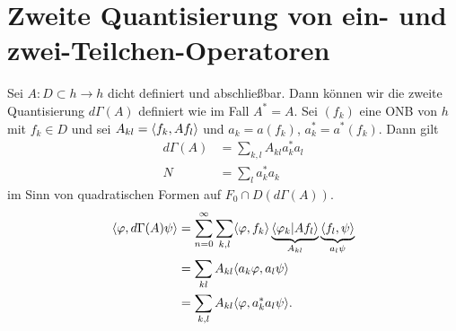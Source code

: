 \documentclass{mycourse}
\begin{document}
\section{Zweite Quantisierung von ein- und zwei-Teilchen-Operatoren}
Sei $A:D\subset h\to h$ dicht definiert und abschließbar. Dann können wir die zweite Quantisierung $d\Gamma(A)$ definiert wie im Fall $A^*=A$. Sei $(f_k)$ eine ONB von $h$ mit $f_k \in D$ und sei $A_{kl} = \langle f_k, A f_l\rangle$ und $a_k = a(f_k)$, $a_k^* = a^*(f_k)$. Dann gilt
\begin{align*}
d\Gamma(A) &= \sum_{k,l} A_{kl} a^*_k a_l\\
N&= \sum_l a_k^* a_k
\end{align*}
im Sinn von quadratischen Formen auf $F_0 \cap D(d\Gamma(A))$.
\begin{align*}
\langle \varphi, d\Gamma(A) \psi\rangle &= \sum_{n=0}^\infty \sum_{k,l} \langle \varphi, f_k\rangle \underbrace{\langle \varphi_k |A f_l\rangle}_{A_{kl}} \underbrace{\langle f_l, \psi\rangle}_{a_l\psi}\\
&= \sum_{kl} A_{kl} \langle a_k \varphi, a_l \psi\rangle\\
&= \sum_{k,l} A_{kl} \langle \varphi, a_k^* a_l \psi \rangle.
\end{align*}

\fixme[Aukommentieren]
\end{document}
